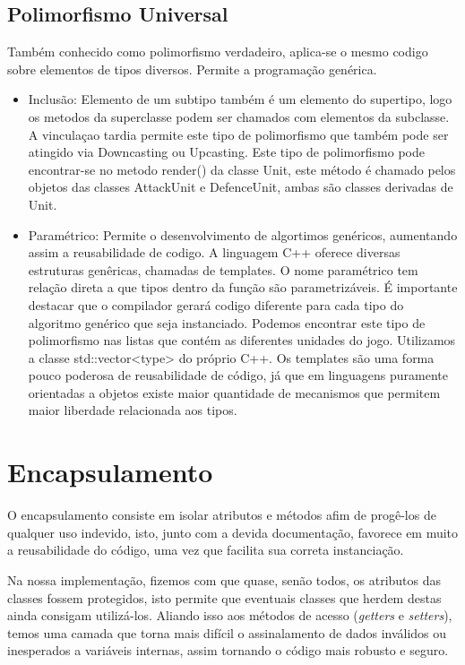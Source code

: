 \documentclass[rel_mlp]{iiufrgs}
\begin{document}
\subsection{Polimorfismo Universal}
 Também conhecido como polimorfismo verdadeiro, aplica-se o mesmo codigo sobre elementos de tipos diversos. Permite a programação genérica.
  \begin{itemize}
	\item Inclusão: Elemento de um subtipo também é um elemento do supertipo, logo os metodos da superclasse podem ser chamados com elementos da subclasse. A vinculaçao tardia permite este tipo de polimorfismo que também pode ser atingido via Downcasting ou Upcasting.
	Este tipo de polimorfismo pode encontrar-se no metodo render() da classe Unit, este método é chamado pelos objetos das classes AttackUnit e DefenceUnit, ambas são classes derivadas de Unit.
	\item Paramétrico: Permite o desenvolvimento de algortimos genéricos, aumentando assim a reusabilidade de codigo. A linguagem C++ oferece diversas estruturas genêricas, chamadas de templates. O nome paramétrico tem relação direta a que tipos dentro da função são parametrizáveis. É importante destacar que o compilador gerará codigo diferente para cada tipo do algoritmo genérico que seja instanciado. Podemos encontrar este tipo de polimorfismo nas listas que contém as diferentes unidades do jogo. Utilizamos a classe std::vector<type> do próprio C++. Os templates são uma forma pouco poderosa de reusabilidade de código, já que em linguagens puramente orientadas a objetos existe maior quantidade de mecanismos que permitem maior liberdade relacionada aos tipos.	
	
 \end{itemize}


\section{Encapsulamento}

	O encapsulamento consiste em isolar atributos e métodos afim de progê-los de qualquer uso indevido, isto, junto com a devida documentação, favorece em muito a reusabilidade do código, uma vez que facilita sua correta instanciação.

	Na nossa implementação, fizemos com que quase, senão todos, os atributos das classes fossem protegidos, isto permite que eventuais classes que herdem destas ainda consigam utilizá-los. Aliando isso aos métodos de acesso (\textit{getters} e \textit{setters}), temos uma camada que torna mais difícil o assinalamento de dados inválidos ou inesperados a variáveis internas, assim tornando o código mais robusto e seguro.
\end{document}
